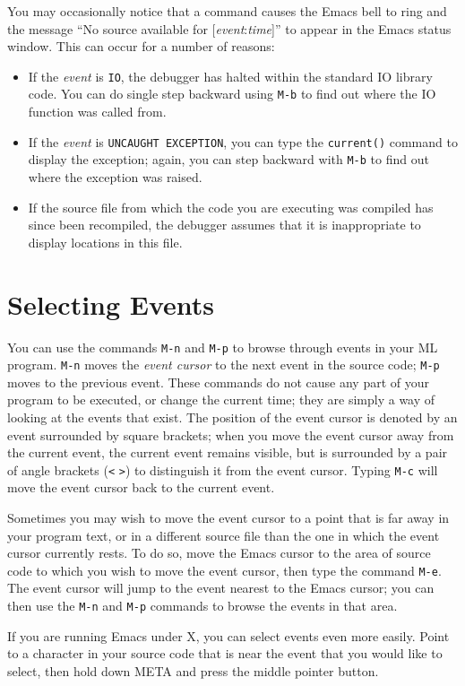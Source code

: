 You may occasionally notice that a command causes the Emacs bell to 
ring and the message ``No source available for [{\em event}:{\em time}]''
to appear in the Emacs status window.  This can occur for a number of
reasons:
\begin{itemize}
\item If the {\em event} is \verb'IO', the debugger has halted within
the standard IO library code. You can do single step backward using \verb'M-b'
to find out where the IO function was called from.
\item If the {\em event} is \verb'UNCAUGHT EXCEPTION', you can type the
\verb'current()' command to display the exception; again, you can step
backward with \verb'M-b' to find out where the exception was raised.
\item If the source file from which the code you are executing was compiled
has since been recompiled, the debugger assumes that it is inappropriate
to display locations in this file.
\end{itemize}

\section{Selecting Events}
You can use the commands \verb'M-n' and \verb'M-p'
to browse through events in your ML
program.  \verb'M-n' moves the {\em event cursor} to the next event in the
source code; \verb'M-p' moves to the previous event.  These commands do not
cause any part of your program to be executed, or change the current
time; they are simply a way of looking at the events that exist.  The
position of the event cursor is denoted by an event surrounded by
square brackets; when you move the event cursor away from the current
event, the current event remains visible, but is surrounded by a pair
of angle brackets (\verb'<' \verb'>') to distinguish it from the event
cursor.  Typing \verb'M-c' will move the event cursor back to the
current event.

Sometimes you may wish to move the event cursor to a point that is far
away in your program text, or in a different source file than the one
in which the event cursor currently rests.  To do so, move the Emacs
cursor to the area of source code to which you wish to move the
event cursor, then
type the command \verb'M-e'.  The event cursor will jump to the event nearest
to the Emacs cursor; you can then use the \verb'M-n' and
\verb'M-p' commands to
browse the events in that area.

If you are running Emacs under X, you can select events even more
easily.  Point to a character in your source code that is near the
event that you would like to select, then hold down META and press the
middle pointer button.


